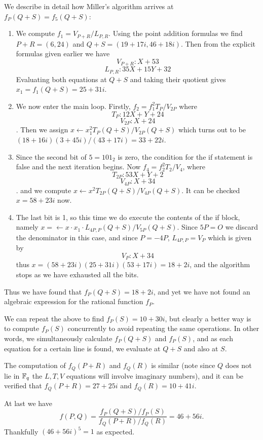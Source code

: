 We describe in detail how Miller's algorithm arrives at $f_P(Q+S) = f_5(Q+S)$:
\begin{enumerate}
\item
We compute $f_1 = V_{P+R} / L_{P,R}$.
Using the point addition formulas we find $P+R = (6,24)$
and $Q+S=(19+17i, 46+18i)$.
Then
from the explicit formulas given earlier we have
\[ V_{P+R} : X + 53 \]
\[ L_{P,R} : 35 X + 15 Y + 32 \]
Evaluating both equations at $Q + S$ and taking their quotient
gives $x_1 = f_1(Q+S) = 25 + 31i$.
\item
We now enter the main loop.
Firstly, $f_2 = f_1^2 T_{P} / V_{2P}$ where
\[ T_{P} : 12 X + Y + 24 \]
\[ V_{2P} : X + 24 \].
Then we assign $x \gets x_1^2 T_{P}(Q+S) / V_{2P}(Q+S)$
which turns out to be $(18 + 16i)(3+45i)/(43+17i) = 33 + 22i$.
\item
Since the second bit of $5 = 101_2$ is zero, the condition for the if statement
is false and the next iteration begins. Now
$f_4 = f_2^2 T_2 / V_4$, where
\[ T_{2P} : 53 X + Y + 2 \]
\[ V_{4P} : X + 34 \].
and we compute $x \gets x^2 T_{2P}(Q+S) / V_{4P}(Q+S)$.
It can be checked $x = 58 + 23i$ now.
\item
The last bit is 1, so this time we do execute the contents of the if block,
namely $x=\gets x \cdot x_1 \cdot L_{4P,P}(Q+S)/V_{5P}(Q+S)$.
Since $5P = O$ we discard the denominator in this case, and since $P = -4P$,
$L_{4P, P} = V_P$ which is given by
\[ V_P : X + 34 \] thus $x = (58+23i)(25+31i)(53+17i) = 18 + 2i$,
and the algorithm stops as we have exhausted all the bits.
\end{enumerate}

Thus we have found that $f_P(Q+S) = 18+2i$, and yet we have not found
an algebraic expression for the rational function $f_P$.

We can repeat the above to find $f_P(S) = 10 + 30i$, but clearly a better way
is to compute $f_P(S)$ concurrently to avoid repeating the same operations.
In other words, we simultaneously calculate $f_P(Q+S)$ and $f_P(S)$, and
as each equation for a certain line is found,
we evaluate at $Q+S$ and also at $S$.

The computation of $f_Q(P+R)$ and $f_Q(R)$ is similar (note since
$Q$ does not lie in $\mathbb{F}_q$ the $L,T,V$ equations will involve imaginary
numbers), and it can be verified that
$f_Q(P+R) = 27+25i$ and $f_Q(R)=10+41i$.

At last we have
\[
f(P,Q) = \frac{f_P(Q+S)/f_P(S)}{f_Q(P+R)/f_Q(R)} = 46+56i .
\] Thankfully $(46+56i)^5 = 1$ as expected.

